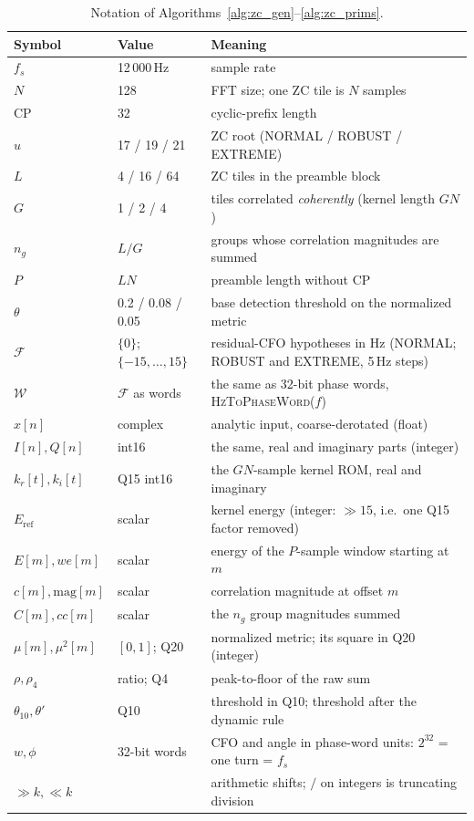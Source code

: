 \begin{table}[H]
    \centering
    \caption{Notation of Algorithms~\ref{alg:zc_gen}--\ref{alg:zc_prims}.}
    \label{tab:zc_notation}
    \small
    \begin{tabular}{@{}lp{2.9cm}p{9.0cm}@{}}
    \toprule
    \textbf{Symbol} & \textbf{Value} & \textbf{Meaning} \\
    \midrule
    $f_s$ & 12\,000\,Hz & sample rate \\
    $N$ & 128 & FFT size; one ZC tile is $N$ samples \\
    $\mathrm{CP}$ & 32 & cyclic-prefix length \\
    $u$ & 17 / 19 / 21 & ZC root (NORMAL / ROBUST / EXTREME) \\
    $L$ & 4 / 16 / 64 & ZC tiles in the preamble block \\
    $G$ & 1 / 2 / 4 & tiles correlated \emph{coherently} (kernel length $GN$) \\
    $n_g$ & $L/G$ & groups whose correlation magnitudes are summed \\
    $P$ & $LN$ & preamble length without CP \\
    $\theta$ & 0.2 / 0.08 / 0.05 & base detection threshold on the normalized metric \\
    $\mathcal{F}$ & $\{0\}$; $\{-15,\ldots,15\}$ & residual-CFO hypotheses in Hz (NORMAL; ROBUST and EXTREME, 5\,Hz steps) \\
    $\mathcal{W}$ & $\mathcal{F}$ as words & the same as 32-bit phase words, \textsc{HzToPhaseWord}($f$) \\
    $x[n]$ & complex & analytic input, coarse-derotated (float) \\
    $I[n], Q[n]$ & int16 & the same, real and imaginary parts (integer) \\
    $k_r[t], k_i[t]$ & Q15 int16 & the $GN$-sample kernel ROM, real and imaginary \\
    $E_{\mathrm{ref}}$ & scalar & kernel energy (integer: $\gg 15$, i.e.\ one Q15 factor removed) \\
    $E[m], we[m]$ & scalar & energy of the $P$-sample window starting at $m$ \\
    $c[m], \mathrm{mag}[m]$ & scalar & correlation magnitude at offset $m$ \\
    $C[m], cc[m]$ & scalar & the $n_g$ group magnitudes summed \\
    $\mu[m], \mu^2[m]$ & $[0,1]$; Q20 & normalized metric; its square in Q20 (integer) \\
    $\rho, \rho_4$ & ratio; Q4 & peak-to-floor of the raw sum \\
    $\theta_{10}, \theta'$ & Q10 & threshold in Q10; threshold after the dynamic rule \\
    $w, \phi$ & 32-bit words & CFO and angle in phase-word units: $2^{32}$ = one turn = $f_s$ \\
    $\gg k, \ll k$ & & arithmetic shifts; $/$ on integers is truncating division \\
    \bottomrule
    \end{tabular}
\end{table}

